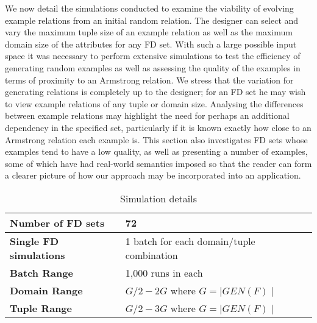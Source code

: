 We now detail the simulations conducted to examine the
viability of evolving example relations from an initial
random relation. The designer can select and vary the maximum tuple size
of an example relation as well as the maximum domain size of the
attributes for any 
FD set. With such a large possible input space it was necessary to
 perform extensive simulations to test
the efficiency of generating random examples as well as assessing
the quality of the examples in terms of proximity to an Armstrong 
relation. We stress that the
variation for generating relations is completely up to the
designer; for an FD set he may wish to view example relations
of any tuple or domain size. Analysing the differences between example relations
 may highlight the need for perhaps
an additional dependency in the specified set, particularly if it
is known exactly how close to an Armstrong relation each example is. 
This section
also investigates FD sets whose examples tend to have a low
quality, as well as presenting a number of examples, some of 
which have had real-world
semantics imposed so that the reader can form a clearer picture
of how our approach may be incorporated into an application.

\medskip

{\line
\begin{table}[ht]
\begin{center}
\begin{tabular}{|l||l|}
\hline
{\bf Number of FD sets}  & 72 \\ \hline
{\bf Single FD simulations} & 1 batch for each domain/tuple combination\\ \hline
{\bf Batch Range} & 1,000 runs in each \\ \hline
{\bf Domain Range} & $G/2 - 2G$ where $ G = \mid GEN(F) \mid$  \\ \hline
{\bf Tuple Range} & $G/2 - 3G$  where $ G = \mid GEN(F) \mid$  \\ \hline 
\end{tabular}
\end{center}
\caption{\label{table:5.01} Simulation details }
\end{table}
}


